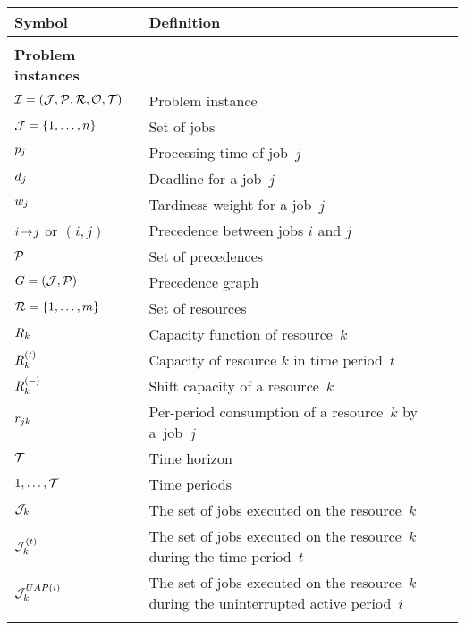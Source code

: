  \label{sec:notation}

\begin{table}[h!]
    \centering
    \begin{tabularx}{\textwidth}{lX}
        \textbf{Symbol} & \textbf{Definition} \\
        \hline
        \\

        \textbf{Problem instances}      & \cellrule \\
        $\mathcal{I} = (\mathcal{J}, \mathcal{P}, \mathcal{R}, \mathcal{O}, \mathcal{T})$ & Problem instance \\
        $\mathcal{J} = \{ 1, \dots, n \}$     & Set of jobs \\
        $p_{j}$                  & Processing time of job~$j$ \\
        $d_{j}$                  & Deadline for a job~$j$ \\
        $w_{j}$           & Tardiness weight for a job~$j$ \\
        $i \hspace{-0.2em} \rightarrow \hspace{-0.2em} j$ or $(i,j)$  & Precedence between jobs $i$ and $j$ \\
        $\mathcal{P}$                  & Set of precedences \\
        $G = (\mathcal{J}, \mathcal{P})$     & Precedence graph \\
        $\mathcal{R} = \{1, \dots, m\}$  & Set of resources \\
        $R_{k}$                 & Capacity function of resource~$k$ \\
        $\capacity{k}{t}$               & Capacity of resource $k$ in time period~$t$ \\
        $\shiftcapacity{k}$             & Shift capacity of a resource~$k$ \\
        $r_{j k}$            & Per-period consumption of a resource~$k$ by a~job~$j$ \\
        $\mathcal{T}$                      & Time horizon \\
        $1, \dots, \mathcal{T}$            & Time periods \\
        $\mathcal{J}_{k}$
            & The set of jobs executed on the resource~$k$ \\
        $\mathcal{J}_{k}^{(t)}$
            & The set of jobs executed on the resource~$k$ during the time period~$t$ \\
        $\mathcal{J}_{k}^{UAP(i)}$
            & The set of jobs executed on the resource~$k$ during the uninterrupted active period~$i$\\
        \\


\end{tabularx}
\end{table}
